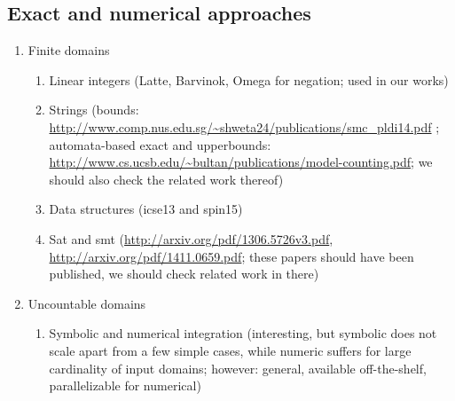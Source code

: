 \subsection{Exact and numerical approaches}
	\begin{enumerate}
		\item Finite domains
			\begin{enumerate}
				\item Linear integers (Latte, Barvinok, Omega for negation; used in our works)
				\item Strings (bounds: \url{http://www.comp.nus.edu.sg/~shweta24/publications/smc\_pldi14.pdf} ; automata-based exact and upperbounds: \url{http://www.cs.ucsb.edu/~bultan/publications/model-counting.pdf}; we should also check the related work thereof)
				\item Data structures (icse13 and spin15)
				\item Sat and smt (\url{http://arxiv.org/pdf/1306.5726v3.pdf}, \url{http://arxiv.org/pdf/1411.0659.pdf}; these papers should have been published, we should check related work in there)
			\end{enumerate}
		
		\item Uncountable domains
			\begin{enumerate}
				\item Symbolic and numerical integration (interesting, but symbolic does not scale apart from a few simple cases, while numeric suffers for large cardinality of input domains; however: general, available off-the-shelf, parallelizable for numerical)
			\end{enumerate}
	\end{enumerate}



